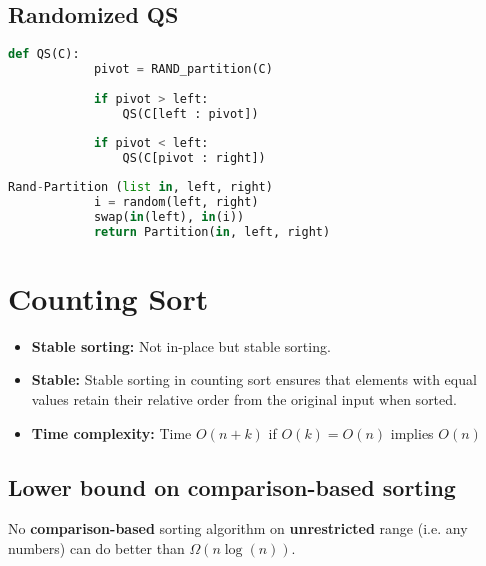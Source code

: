 \documentclass{article}
\begin{document}
\subsection{Randomized QS}
\begin{algo}
    \begin{lstlisting}[language=Python]
        def QS(C):
            pivot = RAND_partition(C)
            
            if pivot > left:
                QS(C[left : pivot])
                
            if pivot < left:
                QS(C[pivot : right])
    \end{lstlisting} 
    \vspace{1em}

    \begin{lstlisting}[language=Python]
        Rand-Partition (list in, left, right)
            i = random(left, right)
            swap(in(left), in(i))
            return Partition(in, left, right)
    \end{lstlisting}
\end{algo}

\newpage

\section{Counting Sort}
\begin{summary}
    \begin{itemize}
        \item \textbf{Stable sorting:} Not in-place but stable sorting.
        \item \textbf{Stable:} Stable sorting in counting sort ensures that elements with equal values retain their relative order from the original input when sorted.
        \item \textbf{Time complexity:} Time $O(n+k)$ if $O(k) = O(n)$ implies $O(n)$
    \end{itemize}
\end{summary}
\subsection{Lower bound on comparison-based sorting}
    \begin{definition}
        No \textbf{comparison-based} sorting algorithm on \textbf{unrestricted} range (i.e. any numbers) can do better than $\Omega(n\log(n))$.    
    \end{definition}
\end{document}
